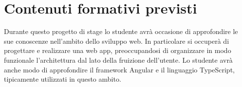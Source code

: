 \section*{Contenuti formativi previsti}
Durante questo progetto di stage lo studente avrà occasione di approfondire le sue conoscenze nell'ambito dello sviluppo web. In particolare si occuperà di progettare e %
realizzare una web app, preoccupandosi di organizzare in modo funzionale l'architettura dal lato della fruizione dell'utente. Lo studente avrà anche modo di approfondire il framework Angular e il linguaggio TypeScript, tipicamente utilizzati in questo ambito.
\newpage